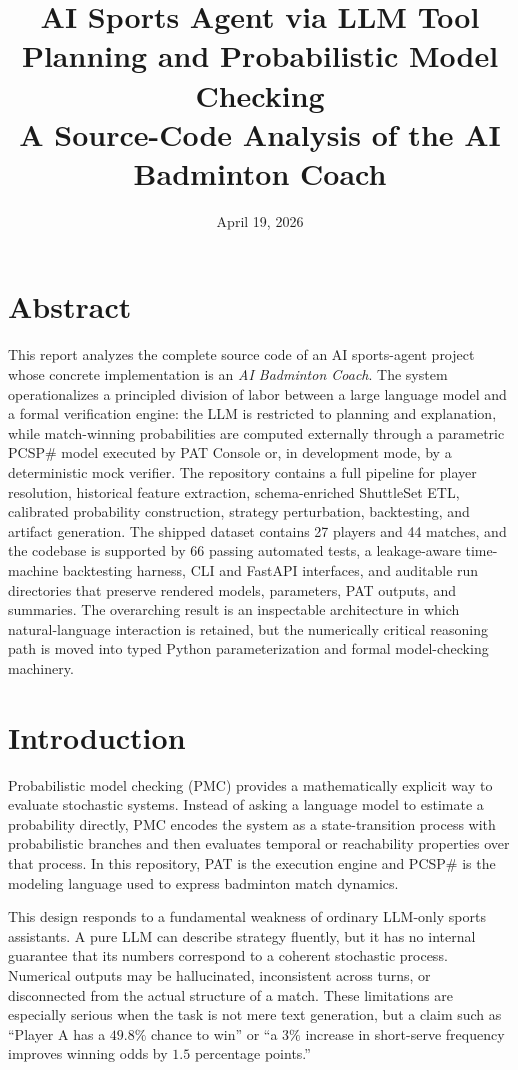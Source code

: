 \documentclass{article}
\title{AI Sports Agent via LLM Tool Planning and Probabilistic Model Checking\\
\large A Source-Code Analysis of the AI Badminton Coach}
\author{}
\date{April 19, 2026}
\begin{document}
\maketitle

\section{Abstract}
This report analyzes the complete source code of an AI sports-agent project whose concrete implementation is an \emph{AI Badminton Coach}. The system operationalizes a principled division of labor between a large language model and a formal verification engine: the LLM is restricted to planning and explanation, while match-winning probabilities are computed externally through a parametric PCSP\# model executed by PAT Console or, in development mode, by a deterministic mock verifier. The repository contains a full pipeline for player resolution, historical feature extraction, schema-enriched ShuttleSet ETL, calibrated probability construction, strategy perturbation, backtesting, and artifact generation. The shipped dataset contains 27 players and 44 matches, and the codebase is supported by 66 passing automated tests, a leakage-aware time-machine backtesting harness, CLI and FastAPI interfaces, and auditable run directories that preserve rendered models, parameters, PAT outputs, and summaries. The overarching result is an inspectable architecture in which natural-language interaction is retained, but the numerically critical reasoning path is moved into typed Python parameterization and formal model-checking machinery.

\section{Introduction}
Probabilistic model checking (PMC) provides a mathematically explicit way to evaluate stochastic systems. Instead of asking a language model to estimate a probability directly, PMC encodes the system as a state-transition process with probabilistic branches and then evaluates temporal or reachability properties over that process. In this repository, PAT is the execution engine and PCSP\# is the modeling language used to express badminton match dynamics.

This design responds to a fundamental weakness of ordinary LLM-only sports assistants. A pure LLM can describe strategy fluently, but it has no internal guarantee that its numbers correspond to a coherent stochastic process. Numerical outputs may be hallucinated, inconsistent across turns, or disconnected from the actual structure of a match. These limitations are especially serious when the task is not mere text generation, but a claim such as ``Player A has a \(49.8\%\) chance to win'' or ``a \(3\%\) increase in short-serve frequency improves winning odds by \(1.5\) percentage points.''
\end{document}
